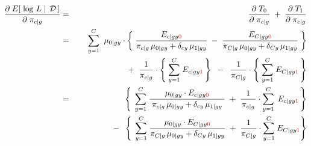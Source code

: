 \begin{eqnarray*}
\dfrac{\partial\;E\!\left[\,\left.\log\,L\;\right\vert\;\mathcal{D}\,\right]}{\partial\;\pi_{c \vert g}}
&=& \dfrac{\partial\;T_{0}}{\partial\;\pi_{c \vert g}} \;+\; \dfrac{\partial\;T_{1}}{\partial\;\pi_{c \vert g}}
\\
&=&
	{\color{white}+} \;\;
	\overset{C}{\underset{y=1}{\sum}}\;\;
	\mu_{0 \vert gy}
	\cdot
	\left\{\;
		\dfrac{E_{c \vert gy{\color{red}0}}}{\pi_{c \vert g}\,\mu_{0 \vert gy} + \delta_{cy}\,\mu_{1\vert gy}}
		\;-\;
		\dfrac{E_{C \vert gy{\color{red}0}}}{
			\pi_{C \vert g}\,\mu_{0 \vert gy}+\delta_{Cy}\,\mu_{1\vert gy}
			}
	\;\right\}
\\
&&
	+ \;\;
	\dfrac{1}{\pi_{c \vert g}}
	\cdot
	\left\{\;
		\overset{C}{\underset{y=1}{\sum}}\;
		E_{c \vert gy{\color{red}1}}
	\,\right\}
	\;\; - \;\;
	\dfrac{1}{\pi_{C \vert g}}
	\cdot
	\left\{\;
		\overset{C}{\underset{y=1}{\sum}}\;
		E_{C \vert gy{\color{red}1}}
	\,\right\}
\\
&=&
	{\color{white}-} \;\;
	\left\{\;\,
		\overset{C}{\underset{y=1}{\sum}}\;
		\dfrac{\mu_{0 \vert gy} \cdot E_{c \vert gy{\color{red}0}}}{
			{\color{white}.}
			\pi_{c \vert g}\,\mu_{0 \vert gy} + \delta_{cy}\,\mu_{1\vert gy}
			{\color{white}.}
			}
		\; + \;
		\dfrac{1}{
			{\color{white}\vert}\!
			\pi_{c \vert g}
			\!{\color{white}\vert}
			}
		\cdot
			\overset{C}{\underset{y=1}{\sum}}\;
			\,E_{c \vert gy{\color{red}1}}\,
	\right\}
\\
&&
	- \;\;
	\left\{\;\,
		\overset{C}{\underset{y=1}{\sum}}\;
		\dfrac{\mu_{0 \vert gy} \cdot E_{C \vert gy{\color{red}0}}}
			{\pi_{C \vert g}\,\mu_{0 \vert gy} + \delta_{Cy}\,\mu_{1\vert gy}}
		\; + \;
		\dfrac{1}{\pi_{C \vert g}}
		\cdot
			\overset{C}{\underset{y=1}{\sum}}\;
			E_{C \vert gy{\color{red}1}}
	\right\}
\end{eqnarray*}

